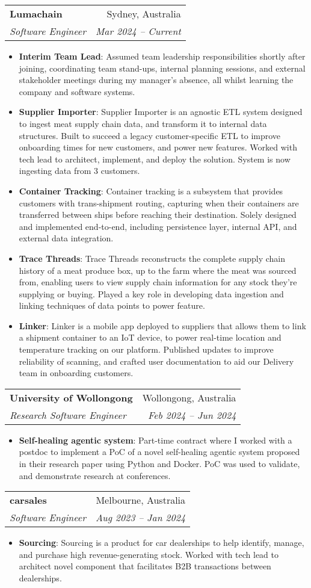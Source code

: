 \documentclass[letterpaper,11pt]{article}
\makeatletter
\newcommand{\resumeItem}[2]{
  \item\small{
    \textbf{#1}{: #2 \vspace{-2pt}}
  }
}
\newcommand{\resumeSubheading}[4]{
  \vspace{-1pt}\item
    \begin{tabular*}{0.97\textwidth}[t]{l@{\extracolsep{\fill}}r}
      \textbf{#1} & #2 \\
      \textit{\small#3} & \textit{\small #4} \\
    \end{tabular*}\vspace{-5pt}
}
\newcommand{\resumeItemListStart}{\begin{itemize}}
\newcommand{\resumeItemListEnd}{\end{itemize}\vspace{-5pt}}
\makeatother
\begin{document}
    \resumeSubheading
      {Lumachain}{Sydney, Australia}
      {Software Engineer}{Mar 2024 -- Current}
      \resumeItemListStart
        \resumeItem{Interim Team Lead}
          {Assumed team leadership responsibilities shortly after joining, coordinating team stand-ups, internal planning sessions, and external stakeholder meetings during my manager’s absence, all whilst learning the company and software systems.}
        \resumeItem{Supplier Importer}
          {Supplier Importer is an agnostic ETL system designed to ingest meat supply chain data, and transform it to internal data structures. Built to succeed a legacy customer-specific ETL to improve onboarding times for new customers, and power new features. Worked with tech lead to architect, implement, and deploy the solution. System is now ingesting data from 3 customers.}
        \resumeItem{Container Tracking}
          {Container tracking is a subsystem that provides customers with trans-shipment routing, capturing when their containers are transferred between ships before reaching their destination. Solely designed and implemented end-to-end, including persistence layer, internal API, and external data integration.}
        \resumeItem{Trace Threads}
          {Trace Threads reconstructs the complete supply chain history of a meat produce box, up to the farm where the meat was sourced from, enabling users to view supply chain information for any stock they're supplying or buying. Played a key role in developing data ingestion and linking techniques of data points to power feature.}
        \resumeItem{Linker}
          {Linker is a mobile app deployed to suppliers that allows them to link a shipment container to an IoT device, to power real-time location and temperature tracking on our platform. Published updates to improve reliability of scanning, and crafted user documentation to aid our Delivery team in onboarding customers. }
      \resumeItemListEnd

    \resumeSubheading
      {University of Wollongong}{Wollongong, Australia}
      {Research Software Engineer}{Feb 2024 -- Jun 2024}
      \resumeItemListStart
        \resumeItem{Self-healing agentic system}
          {Part-time contract where I worked with a postdoc to implement a PoC of a novel self-healing agentic system proposed in their research paper using Python and Docker. PoC was used to validate, and demonstrate research at conferences.}
      \resumeItemListEnd

    \resumeSubheading
      {carsales}{Melbourne, Australia}
      {Software Engineer}{Aug 2023 -- Jan 2024}
      \resumeItemListStart
        \resumeItem{Sourcing}
          {Sourcing is a product for car dealerships to help identify, manage, and purchase high revenue-generating stock. Worked with tech lead to architect novel component that facilitates B2B transactions between dealerships.}
      \resumeItemListEnd
      
\end{document}
